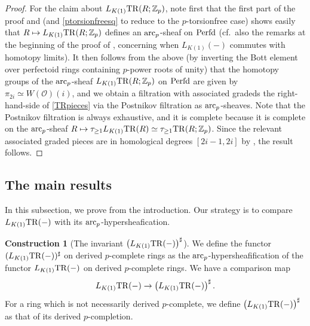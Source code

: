 \documentclass{amsart}
\theoremstyle{definition}
\newtheorem{construction}[theorem]{Construction}
\begin{document}
\begin{proof}
For the claim about $L_{K(1)} \mathrm{TR}(R; \mathbb{Z}_p)$, note first that 
the first part of the proof and  
(and \eqref{ptorsionfreesq} to reduce to the $p$-torsionfree case)
shows easily that $R \mapsto L_{K(1)} \mathrm{TR}(R; \mathbb{Z}_p)$ defines an
$\mathrm{arc}_{{p}}$-sheaf on $\mathrm{Perfd}$ (cf.~also the remarks at the beginning of the proof
of , concerning when $L_{K(1)}(-)$ commutes with homotopy limits).
It then follows from the above (by inverting the Bott element over perfectoid rings
containing $p$-power roots of unity) that the homotopy groups of the $\mathrm{arc}_{{p}}$-sheaf
$L_{K(1)} \mathrm{TR}(R; \mathbb{Z}_p)$ on $\mathrm{Perfd}$ are given by 
$\pi_{2i} \simeq W(\mathcal{O})(i)$, and we obtain a filtration with associated
gradeds the right-hand-side of 
\eqref{TRpieces}
via the Postnikov filtration as $\mathrm{arc}_{{p}}$-sheaves. 
Note that the Postnikov filtration is always exhaustive, and it is complete
because it is complete on the $\mathrm{arc}_{{p}}$-sheaf $R \mapsto \tau_{\geq 1} L_{K(1)} \mathrm{TR}(R) \simeq
\tau_{\geq 1} \mathrm{TR}(R; \mathbb{Z}_p)$. 
Since the relevant associated graded pieces are in homological degrees $[2i-1,
2i]$ by , the result follows. 
\end{proof} 

\subsection{The main results}


In this subsection, we prove  from the introduction. 
Our strategy is to compare $L_{K(1)} \mathrm{TR}(-)$ with its
$\mathrm{arc}_{{p}}$-hypersheafication. 
\newcommand{\shv}{\mathrm{Shv}}





\begin{construction}[The invariant $\left( L_{K(1)} \mathrm{TR}(-) \right)^{\sharp} $]
We define the functor $(L_{K(1)} \mathrm{TR}(-))^{\sharp}$ on derived $p$-complete rings
as the $\mathrm{arc}_{{p}}$-hypersheafification of the functor 
$L_{K(1)} \mathrm{TR}(-)$ on derived $p$-complete rings. 
We have a comparison map 
\begin{equation} L_{K(1)} \mathrm{TR}(-) \to 
\left( L_{K(1)} \mathrm{TR}(-) \right)^{\sharp}. \label{sharpcompmap} \end{equation}
For a ring which is not necessarily derived $p$-complete, we define 
$\left( L_{K(1)} \mathrm{TR}(-) \right)^{\sharp}$ as 
that of its derived $p$-completion. 
\end{construction} 
\end{document}
